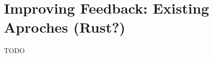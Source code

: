\section{Improving Feedback: Existing Aproches (Rust?)} %


\begin{justify}
TODO
\end{justify}






